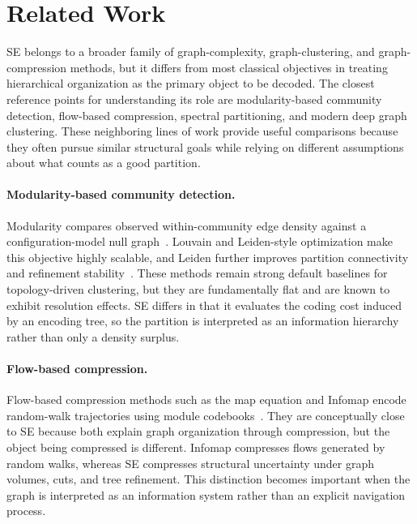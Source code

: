 \section{Related Work}
\label{sec:related}

SE belongs to a broader family of graph-complexity, graph-clustering, and
graph-compression methods, but it differs from most classical objectives in
treating hierarchical organization as the primary object to be decoded.
The closest reference points for understanding its role are modularity-based
community detection, flow-based compression, spectral partitioning, and modern
deep graph clustering.
These neighboring lines of work provide useful comparisons because they often
pursue similar structural goals while relying on different assumptions about
what counts as a good partition.

\paragraph{Modularity-based community detection.}
Modularity compares observed within-community edge density against a
configuration-model null graph~\cite{newman2004findingmodularity}.
Louvain and Leiden-style optimization make this objective highly scalable, and
Leiden further improves partition connectivity and refinement
stability~\cite{traag2019leiden}.
These methods remain strong default baselines for topology-driven clustering,
but they are fundamentally flat and are known to exhibit resolution effects.
SE differs in that it evaluates the coding cost induced by an encoding tree,
so the partition is interpreted as an information hierarchy rather than only a
density surplus.

\paragraph{Flow-based compression.}
Flow-based compression methods such as the map equation and Infomap encode
random-walk trajectories using module codebooks~\cite{rosvall2008maps}.
They are conceptually close to SE because both explain graph organization
through compression, but the object being compressed is different.
Infomap compresses flows generated by random walks, whereas SE compresses
structural uncertainty under graph volumes, cuts, and tree refinement.
This distinction becomes important when the graph is interpreted as an
information system rather than an explicit navigation process.

